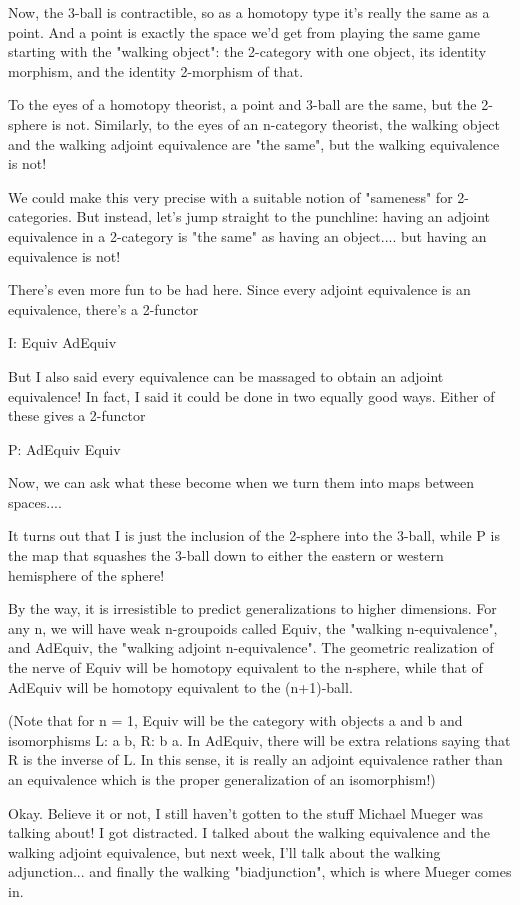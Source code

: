 Now, the 3-ball is contractible, so as a homotopy type it's really the
same as a point.  And a point is exactly the space we'd get from playing
the same game starting with the "walking object": the
2-category with one object, its identity morphism, and the identity
2-morphism of that.


To the eyes of a homotopy theorist, a point and 3-ball are the same, but
the 2-sphere is not.  Similarly, to the eyes of an n-category theorist,
the walking object and the walking adjoint equivalence are "the
same", but the walking equivalence is not!


We could make this very precise with a suitable notion of
"sameness" for 2-categories.  But instead, let's jump straight
to the punchline: having an adjoint equivalence in a 2-category is
"the same" as having an object.... but having an equivalence
is not!

There's even more fun to be had here.  Since every adjoint equivalence
is an equivalence, there's a 2-functor

I: Equiv \to  AdEquiv

But I also said every equivalence can be massaged to obtain an adjoint
equivalence!  In fact, I said it could be done in two equally good ways.
Either of these gives a 2-functor

P: AdEquiv \to  Equiv

Now, we can ask what these become when we turn them into maps between
spaces....

It turns out that I is just the inclusion of the 2-sphere into the
3-ball, while P is the map that squashes the 3-ball down to either the
eastern or western hemisphere of the sphere!  

By the way, it is irresistible to predict generalizations to higher
dimensions.  For any n, we will have weak n-groupoids called Equiv, the
"walking n-equivalence", and AdEquiv, the "walking adjoint
n-equivalence".  The geometric realization of the nerve of Equiv will be
homotopy equivalent to the n-sphere, while that of AdEquiv will be
homotopy equivalent to the (n+1)-ball.

(Note that for n = 1, Equiv will be the category with objects
a and b and isomorphisms L: a \to  b, R: b \to  a.   In AdEquiv, there
will be extra relations saying that R is the inverse of L.  In
this sense, it is really an adjoint equivalence rather than an
equivalence which is the proper generalization of an isomorphism!)

Okay.  Believe it or not, I still haven't gotten to the stuff Michael
Mueger was talking about!  I got distracted.   I talked about the
walking equivalence and the walking adjoint equivalence, but next week,
I'll talk about the walking adjunction... and finally the walking
"biadjunction", which is where Mueger comes in.


